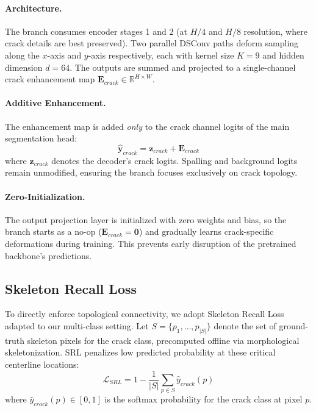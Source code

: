 \documentclass[10pt,twocolumn,letterpaper]{article}
\begin{document}
\paragraph{Architecture.} The branch consumes encoder stages 1 and 2 (at $H/4$ and $H/8$ resolution, where crack details are best preserved). Two parallel DSConv paths deform sampling along the $x$-axis and $y$-axis respectively, each with kernel size $K{=}9$ and hidden dimension $d{=}64$. The outputs are summed and projected to a single-channel crack enhancement map $\mathbf{E}_{crack} \in \mathbb{R}^{H \times W}$.

\paragraph{Additive Enhancement.} The enhancement map is added \emph{only} to the crack channel logits of the main segmentation head:
\begin{equation}
    \hat{\mathbf{y}}_{crack} = \mathbf{z}_{crack} + \mathbf{E}_{crack}
\end{equation}
where $\mathbf{z}_{crack}$ denotes the decoder's crack logits. Spalling and background logits remain unmodified, ensuring the branch focuses exclusively on crack topology.

\paragraph{Zero-Initialization.} The output projection layer is initialized with zero weights and bias, so the branch starts as a no-op ($\mathbf{E}_{crack} = \mathbf{0}$) and gradually learns crack-specific deformations during training. This prevents early disruption of the pretrained backbone's predictions.

\subsection{Skeleton Recall Loss}
\label{sec:srl}

To directly enforce topological connectivity, we adopt Skeleton Recall Loss~\cite{shit2024skeleton} adapted to our multi-class setting. Let $S = \{p_1, \ldots, p_{|S|}\}$ denote the set of ground-truth skeleton pixels for the crack class, precomputed offline via morphological skeletonization. SRL penalizes low predicted probability at these critical centerline locations:
\begin{equation}
    \mathcal{L}_{SRL} = 1 - \frac{1}{|S|} \sum_{p \in S} \hat{y}_{crack}(p)
    \label{eq:srl}
\end{equation}
where $\hat{y}_{crack}(p) \in [0,1]$ is the softmax probability for the crack class at pixel $p$.
\end{document}
